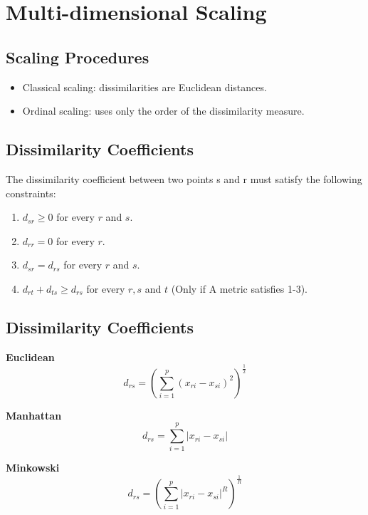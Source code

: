\documentclass[a4paper,9pt,fleqn]{extarticle}
\begin{document}
\section{Multi-dimensional Scaling}
\begin{minipage}[t]{0.45\textwidth}
    \subsection*{Scaling Procedures}
\begin{itemize}
    \item Classical scaling: dissimilarities are Euclidean distances.
    \item Ordinal scaling: uses only the order of the dissimilarity measure.
\end{itemize}
\end{minipage}
\hfill
\begin{minipage}[t]{0.45\textwidth}
    \subsection*{Dissimilarity Coefficients}
    The dissimilarity coefficient between two points s and r must satisfy the following constraints:
    \begin{enumerate}
        \item \(d_{sr} \geq 0\) for every \(r\) and \(s\).
        \item \(d_{rr} = 0\) for every \(r\). 
        \item \(d_{sr} = d_{rs}\) for every \(r\) and \(s\).
        \item  \(d_{rt} + d_{ts} \geq d_{rs}\) for every \(r, s\) and \(t\) (Only if A metric satisfies 1-3).
    \end{enumerate}
\end{minipage}
\subsection*{Dissimilarity Coefficients}
\begin{minipage}[t]{0.32\textwidth}
    \textbf{Euclidean}
    \[
    d_{rs} = \left(\sum_{i=1}^{p}(x_{ri} - x_{si})^2\right)^\frac{1}{2}
    \]
\end{minipage}
\hfill
\begin{minipage}[t]{0.32\textwidth}
    \textbf{Manhattan}
    \[
    d_{rs} = \sum_{i=1}^{p}|x_{ri} - x_{si}|
    \]
\end{minipage}
\hfill
\begin{minipage}[t]{0.32\textwidth}
    \textbf{Minkowski}
    \[
    d_{rs} = \left(\sum_{i=1}^{p}|x_{ri} - x_{si}|^R\right)^\frac{1}{R}
    \]
\end{minipage}
\end{document}
